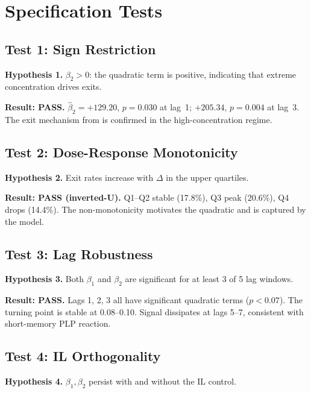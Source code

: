 
\appendix

\section{Specification Tests}\label{app:spec-tests}

\subsection{Test 1: Sign Restriction}

\textbf{Hypothesis 1.} $\beta_2 > 0$: the quadratic term is positive,
indicating that extreme concentration drives exits.

\textbf{Result: PASS.} $\hat{\beta}_2 = +129.20$, $p = 0.030$ at lag~1;
$+205.34$, $p = 0.004$ at lag~3. The exit mechanism from
\cite{capponi2024optimal} is confirmed in the high-concentration regime.

\subsection{Test 2: Dose-Response Monotonicity}

\textbf{Hypothesis 2.} Exit rates increase with $\Delta$ in the upper
quartiles.

\textbf{Result: PASS (inverted-U).} Q1--Q2 stable (17.8\%), Q3 peak (20.6\%),
Q4 drops (14.4\%). The non-monotonicity motivates the quadratic and is
captured by the model.

\subsection{Test 3: Lag Robustness}

\textbf{Hypothesis 3.} Both $\beta_1$ and $\beta_2$ are significant for at
least 3 of 5 lag windows.

\textbf{Result: PASS.} Lags 1, 2, 3 all have significant quadratic terms
($p < 0.07$). The turning point is stable at 0.08--0.10. Signal dissipates at
lags 5--7, consistent with short-memory PLP reaction.

\subsection{Test 4: IL Orthogonality}

\textbf{Hypothesis 4.} $\beta_1, \beta_2$ persist with and without the IL
control.

